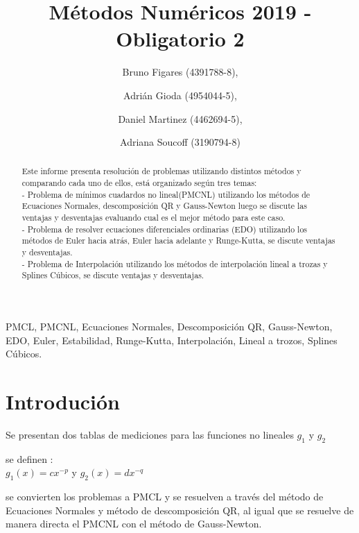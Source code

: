 \documentclass{endm}
\begin{document}
\begin{frontmatter}

\title{Métodos Numéricos 2019 - Obligatorio 2}

\author{Bruno Figares (4391788-8),}
\author{Adrián Gioda (4954044-5),}
\author{Daniel Martinez (4462694-5),}
\author{Adriana Soucoff (3190794-8)}

\address{Instituto de Matem\'atica y Estad\'istica\\ Facultad de Ingenier\'ia. Universidad de la Rep\'ublica\\ Montevideo, Uruguay}


\begin{abstract}
\setlength{\parindent}{12pt}
Este informe presenta resolución de problemas utilizando distintos métodos y comparando cada uno de ellos, está organizado según tres temas:\\
    - Problema de mínimos cuadardos no lineal(PMCNL) utilizando los métodos de Ecuaciones Normales, descomposición QR y Gauss-Newton luego se discute las ventajas y desventajas evaluando cual es el mejor método para este caso.\\
    - Problema de resolver ecuaciones diferenciales ordinarias (EDO) utilizando los métodos de Euler hacia atrás, Euler hacia adelante y Runge-Kutta, se discute ventajas y desventajas.\\
    - Problema de Interpolación utilizando los métodos de interpolación lineal a trozas y Splines Cúbicos, se discute ventajas y desventajas.
\end{abstract}

\begin{keyword}
PMCL, PMCNL, Ecuaciones Normales, Descomposición QR, Gauss-Newton, EDO, Euler, Estabilidad, Runge-Kutta, Interpolación, Lineal a trozos, Splines Cúbicos.
\end{keyword}
\end{frontmatter}

\section{Introdución}\label{intro}
Se presentan dos tablas de mediciones para las funciones no lineales $g_1$ y $g_2$ 


se definen :\\
$g_1(x)=c x^{-p} $ y $g_2(x)=d x^{-q} $

se convierten los problemas a PMCL y se resuelven a través del método de Ecuaciones Normales y método de descomposición QR, al igual que se resuelve de manera directa el PMCNL con el método de Gauss-Newton.
\end{document}
